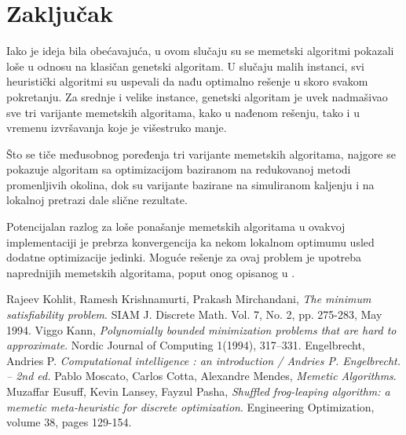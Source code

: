 \documentclass[12pt, a4paper]{article}
\theoremstyle{definition}
\begin{document}
\section{Zaključak}

Iako je ideja bila obećavajuća, u ovom slučaju su se memetski algoritmi pokazali loše u odnosu na klasičan genetski algoritam. U slučaju malih instanci, svi heuristički algoritmi su uspevali da nađu optimalno rešenje u skoro svakom pokretanju. Za srednje i velike instance, genetski algoritam je uvek nadmašivao sve tri varijante memetskih algoritama, kako u nađenom rešenju, tako i u vremenu izvršavanja koje je višestruko manje.

Što se tiče međusobnog poređenja tri varijante memetskih algoritama, najgore se pokazuje algoritam sa optimizacijom baziranom na redukovanoj metodi promenljivih okolina, dok su varijante bazirane na simuliranom kaljenju i na lokalnoj pretrazi dale slične rezultate.

Potencijalan razlog za loše ponašanje memetskih algoritama u ovakvoj implementaciji je prebrza konvergencija ka nekom lokalnom optimumu usled dodatne optimizacije jedinki. Moguće rešenje za ovaj problem je upotreba naprednijih memetskih algoritama, poput onog opisanog u \cite{5}.

\newpage

\begin{thebibliography}{9}
Rajeev Kohlit, Ramesh Krishnamurti, Prakash Mirchandani, \emph{The minimum satisfiability problem}. SIAM J. Discrete Math. Vol. 7, No. 2, pp. 275-283, May 1994.
Viggo Kann, \emph{Polynomially bounded minimization problems that are hard to approximate}. Nordic Journal of Computing 1(1994), 317–331.
Engelbrecht, Andries P. \emph{Computational intelligence : an introduction / Andries P. Engelbrecht. – 2nd ed.}
Pablo Moscato, Carlos Cotta, Alexandre Mendes, \emph{Memetic Algorithms}. 
Muzaffar Eusuff, Kevin Lansey, Fayzul Pasha, \emph{Shuffled frog-leaping algorithm: a memetic meta-heuristic for discrete optimization}. Engineering Optimization, volume 38, pages 129-154.
\end{thebibliography}
\end{document}
